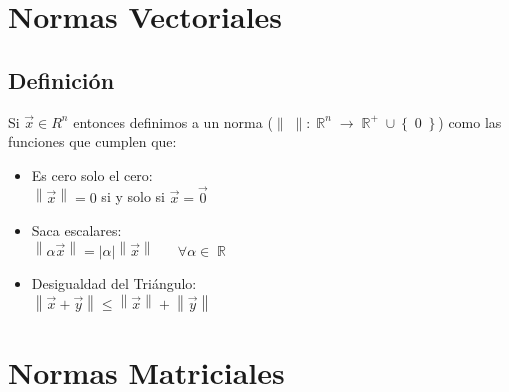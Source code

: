 \documentclass[12pt, fleqn]{report}                             %
\DeclareMathOperator \Space     {\quad}                         %
\theoremstyle{break}                                            %
\newcommand \lLongTo {\longrightarrow}                          %
\DeclareMathOperator \Reals        {\mathbb{R}}                 %
\newcommand{\Set}[1]            {\left\{ \; #1 \; \right\}}     %
\newcommand{\abs}[1]    {\left\lvert #1 \right\lvert}           %
\newcommand{\Abs}[1]    {\left\lVert #1 \right\lVert}           %
\begin{document}
    \chapter{Normas Vectoriales}

        \clearpage
        \section{Definición}

            Si $\vec x \in R^n$ entonces definimos a un norma ($\Abs{\;}: \Reals^n \lLongTo \Reals^+ \cup \Set{0}$)
            como las funciones que cumplen que:
            \begin{itemize}
                \item 
                    Es cero solo el cero: \\
                    $\Abs{\vec x} = 0$ si y solo si $\vec x = \vec 0$
                
                \item 
                    Saca escalares: \\
                    $\Abs{\alpha \vec x} = \abs{\alpha} \Abs{\vec x} \Space \forall \alpha \in \Reals$
                
                \item 
                    Desigualdad del Triángulo: \\
                    $\Abs{\vec x + \vec y} \leq \Abs{\vec x} + \Abs{\vec y}$

            \end{itemize}


    \chapter{Normas Matriciales}

        \clearpage
\end{document}
